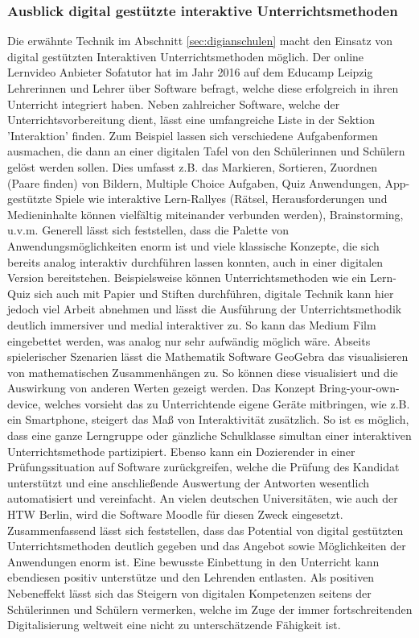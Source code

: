 \subsubsection{Ausblick digital gestützte interaktive Unterrichtsmethoden}\label{sec:interaktiveunterr}
Die erwähnte Technik im Abschnitt \ref{sec:digianschulen} macht den Einsatz von digital gestützten Interaktiven Unterrichtsmethoden möglich. Der online Lernvideo Anbieter Sofatutor hat im Jahr 2016 auf dem Educamp Leipzig Lehrerinnen und Lehrer über Software befragt, welche diese erfolgreich in ihren Unterricht integriert haben\cite{Sofatutor2019}. Neben zahlreicher Software, welche der Unterrichtsvorbereitung dient, lässt eine umfangreiche Liste in der Sektion 'Interaktion' finden. Zum Beispiel lassen sich verschiedene Aufgabenformen ausmachen, die dann an einer digitalen Tafel von den Schülerinnen und Schülern gelöst werden sollen. Dies umfasst z.B. das Markieren, Sortieren, Zuordnen (Paare finden) von Bildern, Multiple Choice Aufgaben, Quiz Anwendungen, App-gestützte Spiele wie interaktive Lern-Rallyes (Rätsel, Herausforderungen und Medieninhalte können vielfältig miteinander verbunden werden), Brainstorming, u.v.m. Generell lässt sich feststellen, dass die Palette von Anwendungsmöglichkeiten enorm ist und viele klassische Konzepte, die sich bereits analog interaktiv durchführen lassen konnten, auch in einer digitalen Version bereitstehen. Beispielsweise können Unterrichtsmethoden wie ein Lern-Quiz sich auch mit Papier und Stiften durchführen, digitale Technik kann hier jedoch viel Arbeit abnehmen und lässt die Ausführung der Unterrichtsmethodik deutlich immersiver und medial interaktiver zu. So kann das Medium Film eingebettet werden, was analog nur sehr aufwändig möglich wäre. Abseits spielerischer Szenarien lässt die Mathematik Software GeoGebra das visualisieren von mathematischen Zusammenhängen zu. So können diese visualisiert und die Auswirkung von anderen Werten gezeigt werden. Das Konzept Bring-your-own-device, welches vorsieht das zu Unterrichtende eigene Geräte mitbringen, wie z.B. ein Smartphone, steigert das Maß von Interaktivität zusätzlich. So ist es möglich, dass eine ganze Lerngruppe oder gänzliche Schulklasse simultan einer interaktiven Unterrichtsmethode partizipiert. Ebenso kann ein Dozierender in einer Prüfungssituation auf Software zurückgreifen, welche die Prüfung des Kandidat unterstützt und eine anschließende Auswertung der Antworten wesentlich automatisiert und vereinfacht. An vielen deutschen Universitäten, wie auch der HTW Berlin, wird die Software Moodle für diesen Zweck eingesetzt. Zusammenfassend lässt sich feststellen, dass das Potential von digital gestützten Unterrichtsmethoden deutlich gegeben und das Angebot sowie Möglichkeiten der Anwendungen enorm ist. Eine bewusste Einbettung in den Unterricht kann ebendiesen positiv unterstütze und den Lehrenden entlasten. Als positiven Nebeneffekt lässt sich das Steigern von digitalen Kompetenzen seitens der Schülerinnen und Schülern vermerken, welche im Zuge der immer fortschreitenden Digitalisierung weltweit eine nicht zu unterschätzende Fähigkeit ist. 

